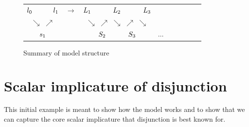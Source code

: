 \documentclass{article}
\begin{document}
\begin{figure}[htp]
  \centering
  \setlength{\tabcolsep}{2pt}
  \begin{tabular}[c]{ *{15}{c} }
   $\listenerZero$ && $\listenerOne$  & $\rightarrow$ & $\ListenerK[1]$ && $\ListenerK[2]$ && $\ListenerK[3]$\\
   \multicolumn{3}{c}{$\searrow$ $\nearrow$} &&\multicolumn{5}{c}{$\searrow$ $\nearrow$ $\searrow$ $\nearrow$ $\searrow$}\\
             & $\speakerOne$ &&&& $\SpeakerK[2]$ && $\SpeakerK[3]$ && $\ldots$   
  \end{tabular}
  \caption{Summary of model structure}
  \label{fig:modstruc}
\end{figure}


\section{Scalar implicature of disjunction}\label{sec:scalar-disj}

This initial example is meant to show how the model works and to show
that we can capture the core scalar implicature that disjunction is
best known for.
\end{document}
